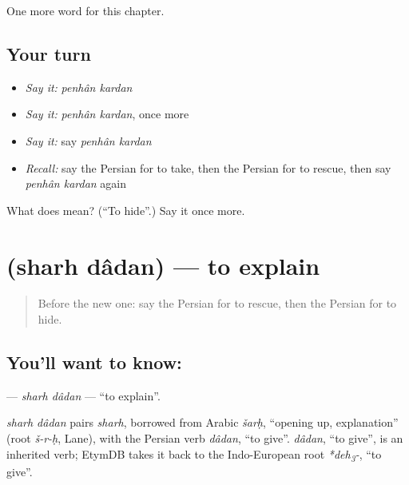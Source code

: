 \begin{grammarlens}[title={What you've built}]
One more word for this chapter.
\end{grammarlens}

\subsection*{Your turn}
\begin{itemize}
\raggedright
  \item \emph{Say it:} \emph{penhân kardan}
  \item \emph{Say it:} \emph{penhân kardan}, once more
  \item \emph{Say it:} say \emph{penhân kardan}
  \item \emph{Recall:} say the Persian for to take, then the Persian for to rescue, then say \emph{penhân kardan} again
\end{itemize}

\begin{tcolorbox}[breakable,colback=teal!4,colframe=teal!35!black,title={Before you move on}]
What does   mean? (\textquotedblleft{}To hide\textquotedblright{}.) Say it once more.
\end{tcolorbox}
\section[\texorpdfstring{\fa{شرح} \fa{دادن} (sharh dâdan)}{شرح دادن (sharh dâdan)}]{  (sharh dâdan) — to explain}

\label{lesson:FA-C223-sharh-dadan}



\begin{quote}
Before the new one: say the Persian for to rescue, then the Persian for to hide.
\end{quote}

\subsection*{You'll want to know:  }
\textbf{ } — \emph{sharh dâdan} — \textquotedblleft{}to explain\textquotedblright{}.

\begin{cousinweb}
\emph{sharh dâdan} pairs \emph{sharh}, borrowed from Arabic \emph{šarḥ}, \textquotedblleft{}opening up, explanation\textquotedblright{} (root \emph{š-r-ḥ}, Lane), with the Persian verb \emph{dâdan}, \textquotedblleft{}to give\textquotedblright{}. \emph{dâdan}, \textquotedblleft{}to give\textquotedblright{}, is an inherited verb; EtymDB takes it back to the Indo-European root \emph{*deh\textsubscript{3}-}, \textquotedblleft{}to give\textquotedblright{}.
\end{cousinweb}

